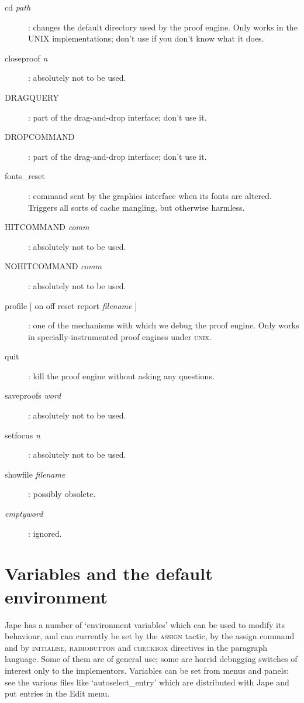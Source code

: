 \begin{description}
\item[cd \textit{path}]: changes the default directory used by the proof engine. Only works in the UNIX implementations; don't use if you don't know what it does.


\item[closeproof \textit{n}]: absolutely not to be used.

\item[DRAGQUERY]: part of the drag-and-drop interface; don't use it.

\item[DROPCOMMAND]: part of the drag-and-drop interface; don't use it.


\item[fonts\_reset]: command sent by the graphics interface when its fonts are altered. Triggers all sorts of cache mangling, but otherwise harmless.


\item[HITCOMMAND \textit{comm}]: absolutely not to be used.

\item[NOHITCOMMAND \textit{comm}]: absolutely not to be used.


\item[profile {[} on {\textbar} off {\textbar} reset {\textbar} report \textit{filename} {]}]: one of the mechanisms with which we debug the proof engine. Only works in specially-instrumented proof engines under \textsc{unix}.


\item[quit]: kill the proof engine without asking any questions.

\item[saveproofs \textit{word}]: absolutely not to be used.

\item[setfocus \textit{n}]: absolutely not to be used.

\item[showfile \textit{filename}]: possibly obsolete.

\item[\textit{emptyword}]: ignored.

\end{description}

\section{Variables and the default environment}


Jape has a number of `environment variables' which can be used to modify its behaviour, and can currently be set by the \textsc{assign} tactic, by the assign command and by \textsc{initialise, radiobutton} and \textsc{checkbox} directives in the paragraph language. Some of them are of general use; some are horrid debugging switches of interest only to the implementors. Variables can be set from menus and panels: see the various files like `autoselect\_entry' which are distributed with Jape and put entries in the Edit menu.


